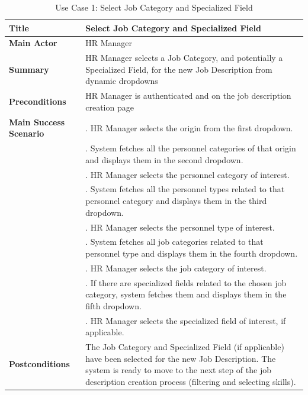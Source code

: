 \begin{table}[H]
    \renewcommand{\arraystretch}{1.5}%
    \caption{Use Case 1: Select Job Category and Specialized Field}
    \centering
    \medskip
    \small
    \begin{tabularx}{1.2\textwidth} {
            | >{\hsize=0.4\hsize\raggedright\arraybackslash}X
            | >{\hsize=1.6\hsize\raggedright\arraybackslash}X |}
        \hline
        \textbf{Title} & Select Job Category and Specialized Field \\
        \hline
        \textbf{Main Actor} & HR Manager \\
        \hline
        \textbf{Summary} & HR Manager selects a Job Category, and potentially a Specialized Field, for the new Job Description from dynamic dropdowns \\
        \hline
        \textbf{Preconditions} & HR Manager is authenticated and on the job description creation page \\
        \hline
        \textbf{Main Success Scenario} & 1. HR Manager selects the origin from the first dropdown. \\
        & 2. System fetches all the personnel categories of that origin and displays them in the second dropdown. \\
        & 3. HR Manager selects the personnel category of interest. \\
        & 4. System fetches all the personnel types related to that personnel category and displays them in the third dropdown. \\
        & 5. HR Manager selects the personnel type of interest. \\
        & 6. System fetches all job categories related to that personnel type and displays them in the fourth dropdown. \\
        & 7. HR Manager selects the job category of interest. \\
        & 8. If there are specialized fields related to the chosen job category, system fetches them and displays them in the fifth dropdown. \\
        & 9. HR Manager selects the specialized field of interest, if applicable. \\
        \hline
        \textbf{Postconditions} & The Job Category and Specialized Field (if applicable) have been selected for the new Job Description. The system is ready to move to the next step of the job description creation process (filtering and selecting skills). \\
        \hline

\end{tabularx}
\end{table}
